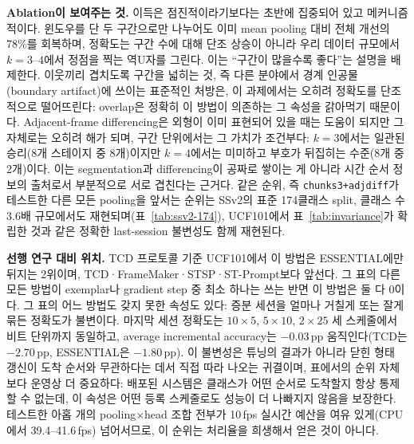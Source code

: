 \documentclass[11pt]{article}
\begin{document}
\textbf{Ablation이 보여주는 것.} 이득은 점진적이라기보다는 초반에
집중되어 있고 메커니즘적이다. 윈도우를 단 두 구간으로만 나누어도 이미
mean pooling 대비 전체 개선의 78\%를 회복하며, 정확도는 구간 수에 대해
단조 상승이 아니라 우리 데이터 규모에서 $k{=}3$--$4$에서 정점을 찍는
역U자를 그린다. 이는 ``구간이 많을수록 좋다''는 설명을 배제한다.
이웃끼리 겹치도록 구간을 넓히는 것, 즉 다른 분야에서 경계
인공물(boundary artifact)에 쓰이는 표준적인 처방은, 이 과제에서는
오히려 정확도를 단조적으로 떨어뜨린다: overlap은 정확히 이 방법이
의존하는 그 속성을 갉아먹기 때문이다. Adjacent-frame differencing은
외형이 이미 표현되어 있을 때는 도움이 되지만 그 자체로는 오히려 해가
되며, 구간 단위에서는 그 가치가 조건부다: $k{=}3$에서는 일관된
승리(8개 스테이지 중 8개)이지만 $k{=}4$에서는 미미하고 부호가 뒤집히는
수준(8개 중 2개)이다. 이는 segmentation과 differencing이 공짜로 쌓이는
게 아니라 시간 순서 정보의 출처로서 부분적으로 서로 겹친다는 근거다.
같은 순위, 즉 \texttt{chunks3+adjdiff}가 테스트한 다른 모든 pooling을
앞서는 순위는 SSv2의 표준 174클래스 split, 클래스 수 $3.6$배
규모에서도 재현되며(표~\ref{tab:ssv2-174}), UCF101에서
표~\ref{tab:invariance}가 확립한 것과 같은 정확한 last-session
불변성도 함께 재현된다.

\textbf{선행 연구 대비 위치.} TCD 프로토콜 기준 UCF101에서 이 방법은
ESSENTIAL에만 뒤지는 2위이며, TCD·FrameMaker·STSP·ST-Prompt보다
앞선다. 그 표의 다른 모든 방법이 exemplar나 gradient step 중 최소
하나는 쓰는 반면 이 방법은 둘 다 0이다. 그 표의 어느 방법도 갖지 못한
속성도 있다: 증분 세션을 얼마나 거칠게 또는 잘게 묶든 정확도가
불변이다. 마지막 세션 정확도는 $10\times5$, $5\times10$, $2\times25$
세 스케줄에서 비트 단위까지 동일하고, average incremental accuracy는
$-0.03$\,pp 움직인다(TCD는 $-2.70$\,pp, ESSENTIAL은 $-1.80$\,pp). 이
불변성은 튜닝의 결과가 아니라 닫힌 형태 갱신이 도착 순서와 무관하다는
데서 직접 따라 나오는 귀결이며, 표에서의 순위 자체보다 운영상 더
중요하다: 배포된 시스템은 클래스가 어떤 순서로 도착할지 항상 통제할 수
없는데, 이 속성은 어떤 등록 스케줄로도 성능이 더 나빠지지 않음을
보장한다. 테스트한 아홉 개의 pooling$\times$head 조합 전부가 10\,fps
실시간 예산을 여유 있게(CPU에서 39.4--41.6\,fps) 넘어서므로, 이 순위는
처리율을 희생해서 얻은 것이 아니다.
\end{document}

